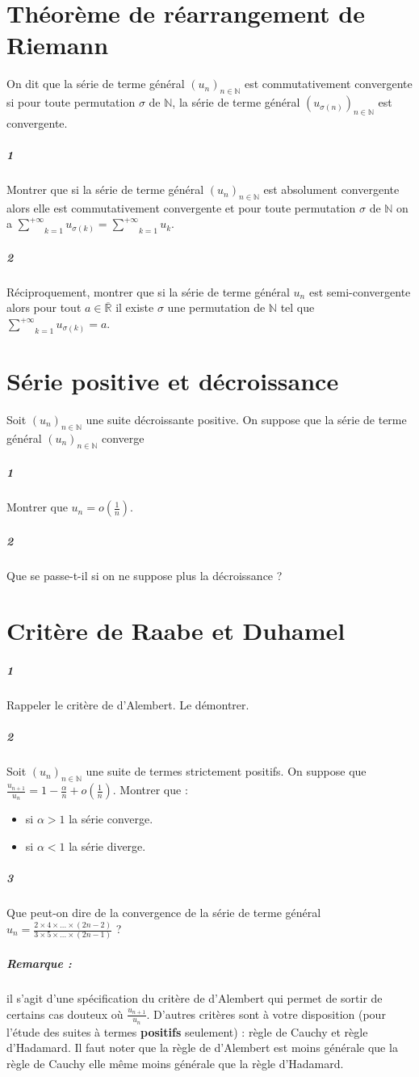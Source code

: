 \documentclass[10pt,a4paper]{article}
\begin{document}
\section{Théorème de réarrangement de Riemann}
On dit que la série de terme général $(u_n)_{n \in \mathbb{N}}$ est commutativement convergente si pour toute permutation $\sigma$ de $\mathbb{N}$, la série de terme général $(u_{\sigma(n)})_{n \in \mathbb{N}}$ est convergente.
\subparagraph{1}Montrer que si la série de terme général $(u_n)_{n \in \mathbb{N}}$ est absolument convergente alors elle est commutativement convergente et pour toute permutation $\sigma$ de $\mathbb{N}$ on a $\underset{k=1}{\overset{+\infty}{\sum}}u_{\sigma(k)} = \underset{k=1}{\overset{+\infty}{\sum}}u_k$.
\subparagraph{2}Réciproquement, montrer que si la série de terme général $u_n$ est semi-convergente alors pour tout $ a \in \overline{\mathbb{R}}$ il existe $\sigma$ une permutation de $\mathbb{N}$ tel que $\underset{k=1}{\overset{+\infty}{\sum}}u_{\sigma(k)} = a$.

\section{Série positive et décroissance}
Soit $(u_n)_{n \in \mathbb{N}}$ une suite décroissante positive. On suppose que la série de terme général $(u_n)_{n \in \mathbb{N}}$ converge
\subparagraph{1}Montrer que $u_n = o(\frac{1}{n})$.
\subparagraph{2}Que se passe-t-il si on ne suppose plus la décroissance ?

\section{Critère de Raabe et Duhamel}
\subparagraph{1}Rappeler le critère de d'Alembert. Le démontrer.
\subparagraph{2}Soit $(u_n)_{n \in \mathbb{N}}$ une suite de termes strictement positifs. On suppose que $\frac{u_{n+1}}{u_n} = 1- \frac{\alpha}{n}+ o \left(\frac{1}{n}\right)$. Montrer que :
\begin{itemize}
\item si $\alpha>1$ la série converge.
\item si $\alpha<1$ la série diverge.
\end{itemize}
\subparagraph{3}Que peut-on dire de la convergence de la série de terme général $u_n = \frac{2 \times 4 \times \dots \times (2n-2)}{3 \times 5 \times \dots \times (2n-1)}$ ?
\subparagraph{Remarque :} il s'agit d'une spécification du critère de d'Alembert qui permet de sortir de certains cas douteux où $\frac{u_{n+1}}{u_n}$. D'autres critères sont à votre disposition (pour l'étude des suites à termes \textbf{positifs} seulement) : règle de Cauchy et règle d'Hadamard. Il faut noter que la règle de d'Alembert est moins générale que la règle de Cauchy elle même moins générale que la règle d'Hadamard.
\end{document}
